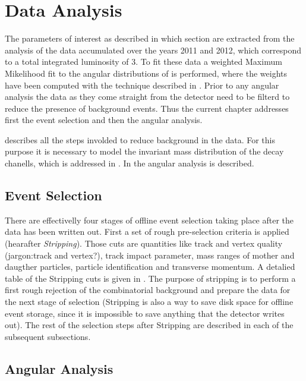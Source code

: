 
\chapter{Data Analysis}
\label{Data_Analysis}

The parameters of interest as described in  {\color{red} which section} are extracted from the analysis of the
\runone \lhcb data accumulated over the years 2011 and 2012, which correspond to a total integrated luminosity
of 3\invfb. To fit these data a weighted Maximum Mikelihood fit to the angular distributions of \BsJpsiKst is performed,
where the weights have been computed with the \sPlot technique \cite{splot} described in .
Prior to any angular analysis the data as they come straight from the detector need to be filterd to reduce the presence of 
background events. Thus the current chapter addresses first the event selection and then the angular analysis.

 describes all the steps involded to reduce background in the data. For this purpose
it is necessary to model the invariant mass distribution of the \BJpsiKpi decay chanells, which is addressed
in . In  the angular analysis is described.\\

\section{Event Selection}
\label{Event_Selection}

There are effectivelly four stages of offline event selection taking place after the data has been written out. 
First a set of rough pre-selection criteria is applied (hearafter {\it Stripping}). Those cuts are quantities like track and vertex quality {\color{red}(jargon:track and vertex?)},
track impact parameter, mass ranges of mother and daugther particles, particle identification and transverse momentum. A detalied 
table of the Stripping cuts is given in . The purpose of stripping is to perform a first rough rejection of the combinatorial
background and prepare the data for the next stage of selection (Stripping is also a way to save disk space for offline event storage, since it is impossible
to save anything that the detector writes out). The rest of the selection steps after Stripping are described in each of the subsequent subsections.



\section{Angular Analysis}
\label{Angular_Analysis}

